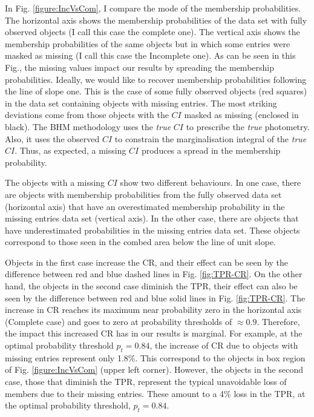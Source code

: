 In Fig. \ref{figure:IncVsCom}, I compare the mode of the membership probabilities. The horizontal axis shows the membership probabilities of the data set with fully observed objects (I call this case the complete one). The vertical axis shows the membership probabilities of the same objects but in which some entries were masked as missing (I call this case the Incomplete one). As can be seen in this Fig., the missing values impact our results by spreading the membership probabilities. Ideally, we would like to recover membership probabilities following the line of slope one. This is the case of some fully observed objects (red squares) in the data set containing objects with missing entries. The most striking deviations come from those objects with the $CI$ masked as missing (enclosed in black). The BHM methodology uses the \emph{true} $CI$ to prescribe the \emph{true} photometry. Also, it uses the observed $CI$ to constrain the marginalisation integral of the \emph{true} $CI$. Thus, as expected, a missing $CI$ produces a spread in the membership probability. 

The objects with a missing $CI$ show two different behaviours. In one case, there are objects with membership probabilities from the fully observed data set (horizontal axis) that have an overestimated membership probability in the missing entries data set (vertical axis). In the other case, there are objects that have underestimated probabilities in the missing entries data set. These objects correspond to those seen in the combed area below the line of unit slope. 

Objects in the first case increase the CR, and their effect can be seen by the difference between red and blue dashed lines in Fig. \ref{fig:TPR-CR}. On the other hand, the objects in the second case diminish the TPR, their effect can also be seen by the difference between red and blue solid lines in Fig. \ref{fig:TPR-CR}. The increase in CR reaches its maximum near probability zero in the horizontal axis (Complete case) and goes to zero at probability thresholds of $\approx 0.9$. Therefore, the impact this increased CR has in our results is marginal. For example, at the optimal probability threshold $p_t=0.84$, the increase of CR due to objects with missing entries represent only 1.8\%. This correspond to the objects in box region of Fig. \ref{figure:IncVsCom} (upper left corner). However, the objects in the second case, those that diminish the TPR, represent the typical unavoidable loss of members due to their missing entries. These amount to a 4\% loss in the TPR, at the optimal probability threshold, $p_t=0.84$.


